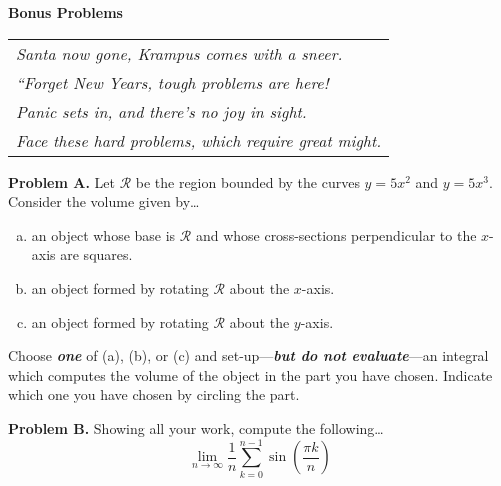 \documentclass[11pt,letterpaper]{article}
\begin{document}

\phantom{.} \hfill {\LARGE \bfseries Bonus Problems} \hfill \phantom{.} 

	\begin{table}[h]
	\centering
	\begin{tabular}{l}
	{\itshape Santa now gone, Krampus comes with a sneer.} \\
	{\itshape ``Forget New Years, tough problems are here!} \\
	{\itshape Panic sets in, and there's no joy in sight.} \\
	{\itshape Face these hard problems, which require great might.}
	\end{tabular}
	\end{table} \par\vspace{0.3cm}

\textbf{Problem A.} Let $\mathcal{R}$ be the region bounded by the curves $y= 5x^2$ and $y= 5x^3$. Consider the volume given by\dots
	\begin{enumerate}[(a)]
	\item an object whose base is $\mathcal{R}$ and whose cross-sections perpendicular to the $x$-axis are squares. 
	\item an object formed by rotating $\mathcal{R}$ about the $x$-axis.
	\item an object formed by rotating $\mathcal{R}$ about the $y$-axis.
	\end{enumerate}
Choose \textit{\textbf{one}} of (a), (b), or (c) and set-up---\textit{\bfseries but do not evaluate}---an integral which computes the volume of the object in the part you have chosen. Indicate which one you have chosen by circling the part. \par\vspace{1cm}

\textbf{Problem B.} Showing all your work, compute the following\dots
	\[
	\lim_{n \to \infty} \dfrac{1}{n} \sum_{k=0}^{n-1} \sin \left( \frac{\pi k}{n} \right)
	\] \pspace
\end{document}
